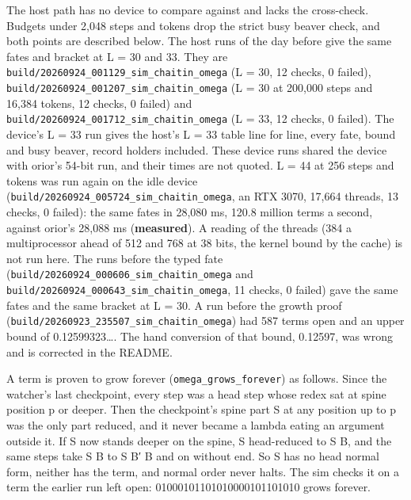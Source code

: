 The host path has no device to compare against and lacks the cross-check. Budgets under 2,048 steps and tokens drop the strict busy beaver check, and both points are described below. The host runs of the day before give the same fates and bracket at L = 30 and 33. They are \texttt{build/\allowbreak{}20260924\_\allowbreak{}001129\_\allowbreak{}sim\_\allowbreak{}chaitin\_\allowbreak{}omega} (L = 30, 12 checks, 0 failed), \texttt{build/\allowbreak{}20260924\_\allowbreak{}001207\_\allowbreak{}sim\_\allowbreak{}chaitin\_\allowbreak{}omega} (L = 30 at 200,000 steps and 16,384 tokens, 12 checks, 0 failed) and \texttt{build/\allowbreak{}20260924\_\allowbreak{}001712\_\allowbreak{}sim\_\allowbreak{}chaitin\_\allowbreak{}omega} (L = 33, 12 checks, 0 failed). The device's L = 33 run gives the host's L = 33 table line for line, every fate, bound and busy beaver, record holders included. These device runs shared the device with orior's 54-bit run, and their times are not quoted. L = 44 at 256 steps and tokens was run again on the idle device (\texttt{build/\allowbreak{}20260924\_\allowbreak{}005724\_\allowbreak{}sim\_\allowbreak{}chaitin\_\allowbreak{}omega}, an RTX 3070, 17,664 threads, 13 checks, 0 failed): the same fates in 28,080 ms, 120.8 million terms a second, against orior's 28,088 ms (\textbf{measured}). A reading of the threads (384 a multiprocessor ahead of 512 and 768 at 38 bits, the kernel bound by the cache) is not run here. The runs before the typed fate (\texttt{build/\allowbreak{}20260924\_\allowbreak{}000606\_\allowbreak{}sim\_\allowbreak{}chaitin\_\allowbreak{}omega} and \texttt{build/\allowbreak{}20260924\_\allowbreak{}000643\_\allowbreak{}sim\_\allowbreak{}chaitin\_\allowbreak{}omega}, 11 checks, 0 failed) gave the same fates and the same bracket at L = 30. A run before the growth proof (\texttt{build/\allowbreak{}20260923\_\allowbreak{}235507\_\allowbreak{}sim\_\allowbreak{}chaitin\_\allowbreak{}omega}) had 587 terms open and an upper bound of 0.12599323…. The hand conversion of that bound, 0.12597, was wrong and is corrected in the README.

A term is proven to grow forever (\texttt{omega\_\allowbreak{}grows\_\allowbreak{}forever}) as follows. Since the watcher's last checkpoint, every step was a head step whose redex sat at spine position p or deeper. Then the checkpoint's spine part S at any position up to p was the only part reduced, and it never became a lambda eating an argument outside it. If S now stands deeper on the spine, S head-reduced to S B, and the same steps take S B to S B′ B and on without end. So S has no head normal form, neither has the term, and normal order never halts. The sim checks it on a term the earlier run left open: 01000101101010000101101010 grows forever.

